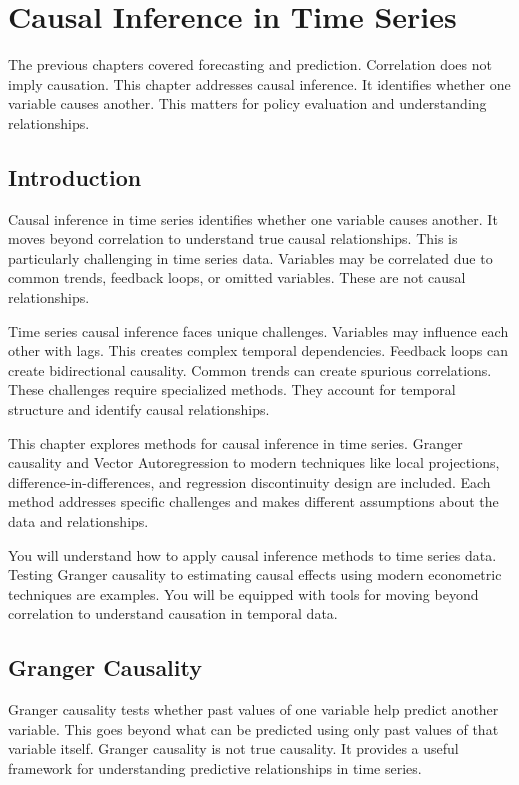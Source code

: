 \chapter{Causal Inference in Time Series}

The previous chapters covered forecasting and prediction. Correlation does not imply causation. This chapter addresses causal inference. It identifies whether one variable causes another. This matters for policy evaluation and understanding relationships.

\section{Introduction}

Causal inference in time series identifies whether one variable causes another. It moves beyond correlation to understand true causal relationships. This is particularly challenging in time series data. Variables may be correlated due to common trends, feedback loops, or omitted variables. These are not causal relationships.

Time series causal inference faces unique challenges. Variables may influence each other with lags. This creates complex temporal dependencies. Feedback loops can create bidirectional causality. Common trends can create spurious correlations. These challenges require specialized methods. They account for temporal structure and identify causal relationships.

This chapter explores methods for causal inference in time series. Granger causality and Vector Autoregression to modern techniques like local projections, difference-in-differences, and regression discontinuity design are included. Each method addresses specific challenges and makes different assumptions about the data and relationships.

You will understand how to apply causal inference methods to time series data. Testing Granger causality to estimating causal effects using modern econometric techniques are examples. You will be equipped with tools for moving beyond correlation to understand causation in temporal data.

\section{Granger Causality}

Granger causality tests whether past values of one variable help predict another variable. This goes beyond what can be predicted using only past values of that variable itself. Granger causality is not true causality. It provides a useful framework for understanding predictive relationships in time series.

